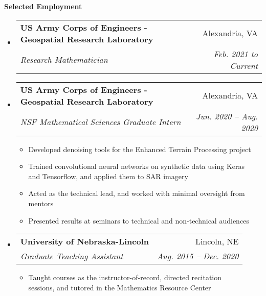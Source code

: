 \documentclass[letterpaper,11pt]{article}
\makeatletter
\newcommand{\resitem}[1]{\item #1 \vspace{-2pt}}
\newcommand{\resheading}[1]{{\large \colorbox{mygrey}{\begin{minipage}{\textwidth}{\textbf{#1 \vphantom{p\^{E}}}}\end{minipage}}}}
\newcommand{\ressubheading}[4]{
\begin{tabular*}{6.5in}{l@{\extracolsep{\fill}}r}
		\textbf{#1} & #2 \\
		\textit{#3} & \textit{#4} \\
\end{tabular*}\vspace{-6pt}}
\makeatother
\begin{document}
\resheading{Selected Employment}
	\begin{itemize}
		\item
		\ressubheading{US Army Corps of Engineers - Geospatial Research Laboratory}{Alexandria, VA}{Research Mathematician}{Feb. 2021 to Current}
		
		\item
		\ressubheading{US Army Corps of Engineers - Geospatial Research Laboratory}{Alexandria, VA}{NSF Mathematical Sciences Graduate Intern}{Jun. 2020 -- Aug. 2020}
		{\footnotesize
			\begin{itemize}
				\resitem{Developed denoising tools for the Enhanced Terrain Processing project}
				\resitem{Trained convolutional neural networks on synthetic data using Keras \\ and Tensorflow, and applied them to SAR imagery}
				\resitem{Acted as the technical lead, and worked with minimal oversight from mentors}
				\resitem{Presented results at seminars to technical and non-technical audiences}
		\end{itemize}}

\newpage

		\item
			{\ressubheading{University of Nebraska-Lincoln}{Lincoln, NE}{Graduate Teaching Assistant}{Aug. 2015 -- Dec. 2020}
				{ \footnotesize
				\begin{itemize}
					\resitem{Taught courses as the instructor-of-record, directed recitation \\ sessions, and tutored in the Mathematics Resource Center}
				\end{itemize}}}


\end{itemize}
\end{document}
